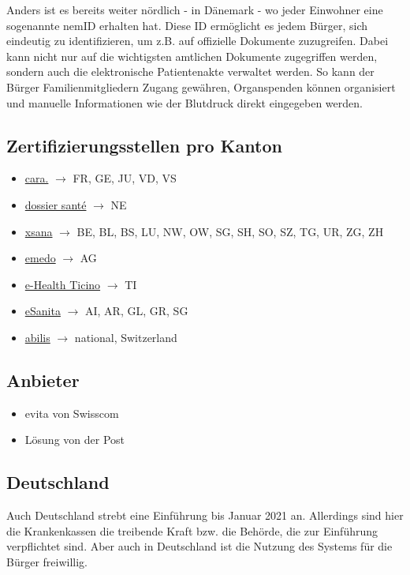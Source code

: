 \documentclass{report}
\theoremstyle{definition}
\theoremstyle{example}
\begin{document}
Anders ist es bereits weiter nördlich - in Dänemark - wo jeder Einwohner eine sogenannte nemID erhalten hat. Diese ID ermöglicht es jedem Bürger, sich eindeutig zu identifizieren, um z.B. auf offizielle Dokumente zuzugreifen. Dabei kann nicht nur auf die wichtigsten amtlichen Dokumente zugegriffen werden, sondern auch die elektronische Patientenakte verwaltet werden. 
So kann der Bürger Familienmitgliedern Zugang gewähren, Organspenden können organisiert und manuelle Informationen wie der Blutdruck direkt eingegeben werden.

\subsection{Zertifizierungsstellen pro Kanton}
\begin{itemize}
   \item \href{https://www.cara.ch/}{cara.} $\rightarrow$ FR, GE, JU, VD, VS
   \item \href{https://hesav.ch/dossier-sante/}{dossier santé} $\rightarrow$ NE
   \item \href{https://www.xsana.ch/bevoelkerung#benefits}{xsana} $\rightarrow$ BE, BL, BS, LU, NW, OW, SG, SH, SO, SZ, TG, UR, ZG, ZH
   \item \href{https://www.mein-emedo.ch/}{emedo} $\rightarrow$ AG 
   \item \href{https://www.ehti.ch/}{e-Health Ticino} $\rightarrow$ TI
   \item \href{https://esanita.ch/}{eSanita} $\rightarrow$ AI, AR, GL, GR, SG
   \item \href{https://www.abilis.ch/de}{abilis} $\rightarrow$ national, Switzerland
\end{itemize}

\subsection{Anbieter}
\begin{itemize}
   \item evita von Swisscom
   \item Lösung von der Post
\end{itemize}

\subsection{Deutschland}
Auch Deutschland strebt eine Einführung bis Januar 2021 an. Allerdings sind hier die Krankenkassen die treibende Kraft bzw. die Behörde, die zur Einführung verpflichtet sind. Aber auch in Deutschland ist die Nutzung des Systems für die Bürger freiwillig.
\end{document}
